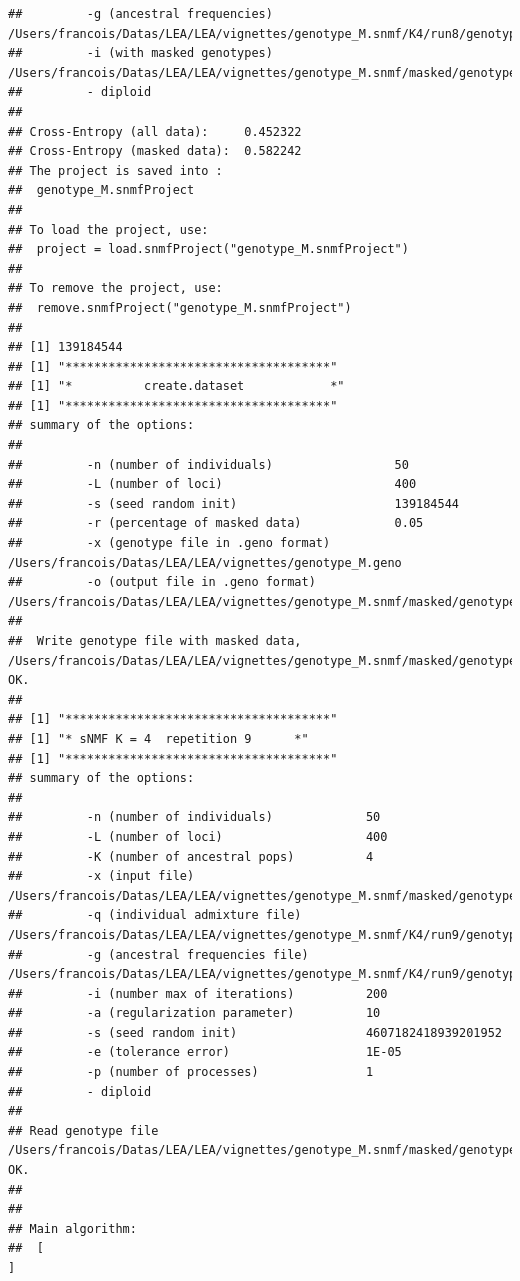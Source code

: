 \documentclass[12pt,a4paper,oneside]{article}\usepackage[]{graphicx}\usepackage[]{color}
\makeatletter
\newenvironment{kframe}{%
 \def\at@end@of@kframe{}%
 \ifinner\ifhmode%
  \def\at@end@of@kframe{\end{minipage}}%
  \begin{minipage}{\columnwidth}%
 \fi\fi%
 \def\FrameCommand##1{\hskip\@totalleftmargin \hskip-\fboxsep
 \colorbox{shadecolor}{##1}\hskip-\fboxsep
     \hskip-\linewidth \hskip-\@totalleftmargin \hskip\columnwidth}%
 \MakeFramed {\advance\hsize-\width
   \@totalleftmargin\z@ \linewidth\hsize
   \@setminipage}}%
 {\par\unskip\endMakeFramed%
 \at@end@of@kframe}
\newenvironment{knitrout}{}{} %
\makeatother
\begin{document}
\begin{knitrout}
\begin{kframe}
\begin{verbatim}
##         -g (ancestral frequencies)         /Users/francois/Datas/LEA/LEA/vignettes/genotype_M.snmf/K4/run8/genotype_M_r8.4.G
##         -i (with masked genotypes)         /Users/francois/Datas/LEA/LEA/vignettes/genotype_M.snmf/masked/genotype_M_I.geno
##         - diploid
## 
## Cross-Entropy (all data):	 0.452322
## Cross-Entropy (masked data):	 0.582242
## The project is saved into :
##  genotype_M.snmfProject 
## 
## To load the project, use:
##  project = load.snmfProject("genotype_M.snmfProject")
## 
## To remove the project, use:
##  remove.snmfProject("genotype_M.snmfProject")
## 
## [1] 139184544
## [1] "*************************************"
## [1] "*          create.dataset            *"
## [1] "*************************************"
## summary of the options:
## 
##         -n (number of individuals)                 50
##         -L (number of loci)                        400
##         -s (seed random init)                      139184544
##         -r (percentage of masked data)             0.05
##         -x (genotype file in .geno format)         /Users/francois/Datas/LEA/LEA/vignettes/genotype_M.geno
##         -o (output file in .geno format)           /Users/francois/Datas/LEA/LEA/vignettes/genotype_M.snmf/masked/genotype_M_I.geno
## 
##  Write genotype file with masked data, /Users/francois/Datas/LEA/LEA/vignettes/genotype_M.snmf/masked/genotype_M_I.geno:		OK.
## 
## [1] "*************************************"
## [1] "* sNMF K = 4  repetition 9      *"
## [1] "*************************************"
## summary of the options:
## 
##         -n (number of individuals)             50
##         -L (number of loci)                    400
##         -K (number of ancestral pops)          4
##         -x (input file)                        /Users/francois/Datas/LEA/LEA/vignettes/genotype_M.snmf/masked/genotype_M_I.geno
##         -q (individual admixture file)         /Users/francois/Datas/LEA/LEA/vignettes/genotype_M.snmf/K4/run9/genotype_M_r9.4.Q
##         -g (ancestral frequencies file)        /Users/francois/Datas/LEA/LEA/vignettes/genotype_M.snmf/K4/run9/genotype_M_r9.4.G
##         -i (number max of iterations)          200
##         -a (regularization parameter)          10
##         -s (seed random init)                  4607182418939201952
##         -e (tolerance error)                   1E-05
##         -p (number of processes)               1
##         - diploid
## 
## Read genotype file /Users/francois/Datas/LEA/LEA/vignettes/genotype_M.snmf/masked/genotype_M_I.geno:		OK.
## 
## 
## Main algorithm:
## 	[                                                                           ]

\end{verbatim}
\end{kframe}
\end{knitrout}
\end{document}
